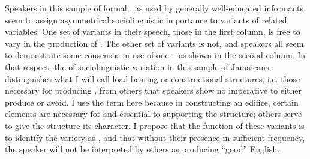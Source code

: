 Speakers in this sample of formal , as used by generally well-educated informants, seem to assign asymmetrical sociolinguistic importance to variants of related variables.  One set of variants in their speech, those in the first column, is free to vary in the production of .  The other set of variants is not, and speakers all seem to demonstrate some consensus in use of one – as shown in the second column.  In that respect, the  of sociolinguistic variation in this sample of Jamaicans, distinguishes what I will call load-bearing or constructional structures, i.e. those necessary for producing , from others that speakers show no imperative to either produce or avoid.  I use the term  here because in constructing an edifice, certain elements are necessary for and essential to supporting the structure; others serve to give the structure its character.  I propose that the function of these  variants is to identify the variety as , and that without their presence in sufficient frequency, the speaker will not be interpreted by others as producing “good” English.  

